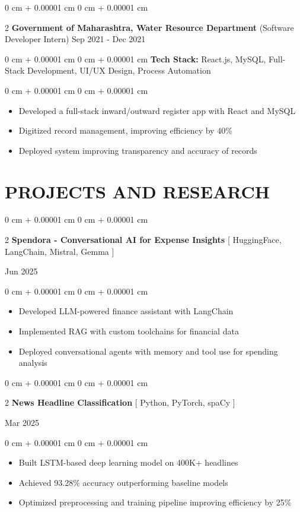 \documentclass[9pt, letterpaper]{article}
\newenvironment{highlights}{
    \begin{itemize}[
        topsep=0.05 cm,
        parsep=0 pt,
        partopsep=0pt,
        itemsep=0pt,
        leftmargin=10pt
    ]
}{
    \end{itemize}
} %
\newenvironment{onecolentry}{
    \begin{adjustwidth}{
        0 cm + 0.00001 cm}{
        0 cm + 0.00001 cm}
}{
    \end{adjustwidth}
} %
\newenvironment{twocolentry}[2][]{
    \onecolentry
    \def\secondColumn{#2}
    \setcolumnwidth{\fill, 4.5 cm}
    \begin{paracol}{2}
}{
    \switchcolumn \raggedleft \secondColumn
    \end{paracol}
    \endonecolentry
} %
\begin{document}
    \begin{twocolentry}{Sep 2021 - Dec 2021}\textbf{Government of Maharashtra, Water Resource Department} (Software Developer Intern)\end{twocolentry}
    \begin{onecolentry}\textbf{Tech Stack:} React.js, MySQL, Full-Stack Development, UI/UX Design, Process Automation \end{onecolentry}
    \begin{onecolentry}
        \begin{highlights}
            \item Developed a full-stack inward/outward register app with React and MySQL
            \item Digitized record management, improving efficiency by 40\%
            \item Deployed system improving transparency and accuracy of records
        \end{highlights}
    \end{onecolentry}

\section{PROJECTS AND RESEARCH}

    \begin{twocolentry}
        {Jun 2025}\textbf{Spendora - Conversational AI for Expense Insights} [ HuggingFace, LangChain, Mistral, Gemma ]
    \end{twocolentry}
    \begin{onecolentry}
        \begin{highlights}
            \item Developed LLM-powered finance assistant with LangChain
            \item Implemented RAG with custom toolchains for financial data
            \item Deployed conversational agents with memory and tool use for spending analysis
        \end{highlights}
    \end{onecolentry}

    \begin{twocolentry}
        {Mar 2025}\textbf{News Headline Classification} [ Python, PyTorch, spaCy ]
    \end{twocolentry}
    \begin{onecolentry}
        \begin{highlights}
            \item Built LSTM-based deep learning model on 400K+ headlines
            \item Achieved 93.28\% accuracy outperforming baseline models
            \item Optimized preprocessing and training pipeline improving efficiency by 25\%
        \end{highlights}
    \end{onecolentry}
\end{document}
